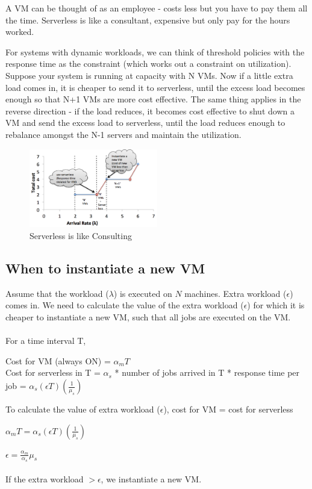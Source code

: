\documentclass[letter,11pt]{article}
\begin{document}
A VM can be thought of as an employee - costs less but you have to pay them all the time. Serverless is like a consultant, expensive but only pay for the hours worked.

For systems with dynamic workloads, we can think of threshold policies with the response time as the constraint (which works out a constraint on utilization). Suppose your system is running at capacity with N VMs. Now if a little extra load comes in, it is cheaper to send it to serverless, until the excess load becomes enough so that N+1 VMs are more cost effective. The same thing applies in the reverse direction - if the load reduces, it becomes cost effective to shut down a VM and send the excess load to serverless, until the load reduces enough to rebalance amongst the N-1 servers and maintain the utilization.

\begin{figure}[h]
    \centering
    \includegraphics[width=0.5\textwidth]{consulting_model}
    \caption{Serverless is like Consulting}
    \label{fig:model}
\end{figure}

\subsection{When to instantiate a new VM} 

Assume that the workload ($\lambda$) is executed on $N$ machines. Extra workload ($\epsilon$) comes in. We need to calculate the value of the extra workload ($\epsilon$) for which it is cheaper to instantiate a new VM, such that all jobs are executed on the VM. \\ \\ 
For a time interval T, 

Cost for VM (always ON)  = $\alpha_m T$ \\

Cost for serverless in T = $\alpha_s$ * number of jobs arrived in T * response time per job = $\alpha_s (\epsilon T) (\frac{1}{\mu_s})$ 

To calculate the value of extra workload ($\epsilon$), cost for VM = cost for serverless

$\alpha_m T = \alpha_s (\epsilon T) (\frac{1}{\mu_s})$ 

$\epsilon =  \frac{\alpha_m}{\alpha_s} \mu_s$ \\ \\
If the extra workload $> \epsilon$, we instantiate a new VM.
\end{document}

